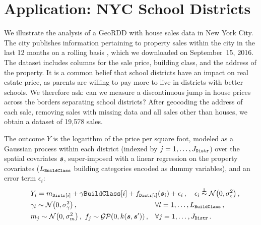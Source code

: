 \documentclass{article}
\begin{document}
\section{Application: NYC School Districts}
\label{sec:NYC_example}

We illustrate the analysis of a GeoRDD with house sales data in New York City.
The city publishes information pertaining to property sales within the city in the last 12 months on a rolling basis \citep{nyc_data}, which we downloaded on September~15, 2016.
The dataset includes columns for the sale price, building class, and the address of the property.
It is a common belief that school districts have an impact on real estate price, as parents are willing to pay more to live in districts with better schools.
We therefore ask: can we measure a discontinuous jump in house prices across the borders separating school districts?
After geocoding the address of each sale, removing sales with missing data and all sales other than houses, we obtain a dataset of 19,578 sales.

The outcome $Y$ is the logarithm of the price per square foot, 
modeled as a Gaussian process within each district (indexed by \(j=1,\dotsc,J_{\mathtt{Distr}}\)) over the spatial covariates \(\bm{s}\), super-imposed with a linear regression on the property covariates (\(L_{\mathtt{BuildClass}}\) building categories encoded as dummy variables), and an error term $\epsilon_i$:
\begin{equation}
    \begin{aligned}
        & Y_i = %
        	m_{\district\sbr{i}} + \gamma{\building\sbr{i}}
        	+ f_{\district\sbr{i}}(\svec_i) + \epsilon_i 
			\,,\quad
 			\epsilon_i \overset{\indep}{\sim} \normal\del{0, \sigman^2} 
			\,,
			\phantom{\hspace{-10cm}} %
            \\
        & \gamma_{l} \sim \normal\del{0, \sigmabeta^2}
			\,,
			&&
			\forall
			l=1,\dotsc,L_\building \,, \\
        & m_{j} \sim \normal\del{0, \sigmamu^2}
        \,,\ 
        f_j \sim \GP\del{0, k(\svec, \svec')}
			\,,
			&&
			\forall
			j=1,\dotsc,J_\district
		\,.
    \end{aligned}
    \label{eq:nyc_model}
\end{equation}
\end{document}
